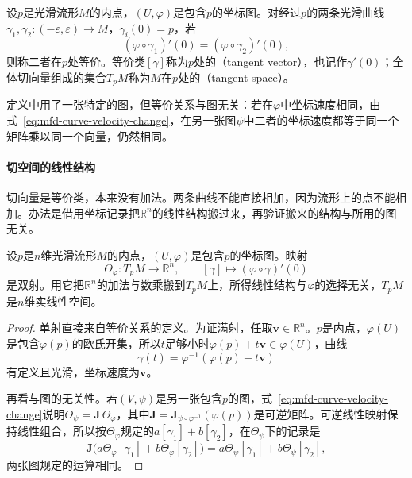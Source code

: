 \begin{definition}[切向量与切空间]
\label{def:mfd-tangent-space}
设$p$是光滑流形$M$的内点，$(U,\varphi)$是包含$p$的坐标图。对经过$p$的两条光滑曲线$\gamma_1,\gamma_2:(-\varepsilon,\varepsilon)\to M$，$\gamma_i(0)=p$，若
\begin{equation}
(\varphi\circ\gamma_1)'(0)=(\varphi\circ\gamma_2)'(0),
\label{eq:mfd-curve-equivalence}
\end{equation}
则称二者在$p$处等价。等价类$[\gamma]$称为$p$处的（tangent vector），也记作$\gamma'(0)$；全体切向量组成的集合$T_pM$称为$M$在$p$处的（tangent space）。
\end{definition}

定义中用了一张特定的图，但等价关系与图无关：若在$\varphi$中坐标速度相同，由式~\eqref{eq:mfd-curve-velocity-change}，在另一张图$\psi$中二者的坐标速度都等于同一个矩阵乘以同一个向量，仍然相同。

\paragraph{切空间的线性结构}
切向量是等价类，本来没有加法。两条曲线不能直接相加，因为流形上的点不能相加。办法是借用坐标记录把$\mathbb R^n$的线性结构搬过来，再验证搬来的结构与所用的图无关。

\begin{theorem}
\label{thm:mfd-tangent-linear}
设$p$是$n$维光滑流形$M$的内点，$(U,\varphi)$是包含$p$的坐标图。映射
\begin{equation}
\Theta_\varphi:T_pM\to\mathbb R^n,\qquad [\gamma]\mapsto(\varphi\circ\gamma)'(0)
\label{eq:mfd-velocity-record}
\end{equation}
是双射。用它把$\mathbb R^n$的加法与数乘搬到$T_pM$上，所得线性结构与$\varphi$的选择无关，$T_pM$是$n$维实线性空间。
\end{theorem}

\begin{proof}
单射直接来自等价关系的定义。为证满射，任取$\bm v\in\mathbb R^n$。$p$是内点，$\varphi(U)$是包含$\varphi(p)$的欧氏开集，所以$t$足够小时$\varphi(p)+t\bm v\in\varphi(U)$，曲线
\[
\gamma(t)=\varphi^{-1}(\varphi(p)+t\bm v)
\]
有定义且光滑，坐标速度为$\bm v$。

再看与图的无关性。若$(V,\psi)$是另一张包含$p$的图，式~\eqref{eq:mfd-curve-velocity-change}说明$\Theta_\psi=\bm J\,\Theta_\varphi$，其中$\bm J=\bm J_{\psi\circ\varphi^{-1}}(\varphi(p))$是可逆矩阵。可逆线性映射保持线性组合，所以按$\Theta_\varphi$规定的$a[\gamma_1]+b[\gamma_2]$，在$\Theta_\psi$下的记录是
\[
\bm J\bigl(a\Theta_\varphi[\gamma_1]+b\Theta_\varphi[\gamma_2]\bigr)
=a\Theta_\psi[\gamma_1]+b\Theta_\psi[\gamma_2],
\]
两张图规定的运算相同。
\end{proof}

